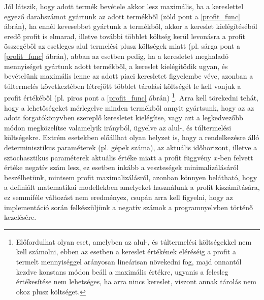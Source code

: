 Jól látszik, hogy adott termék bevétele akkor lesz maximális, ha a kereslettel egyező darabszámot gyártunk az adott termékből (zöld pont a \ref{profit_func} ábrán), ha ennél kevesebbet gyártunk a termékből, akkor a kereslet kielégítéséből eredő profit is elmarad, illetve további többlet költség kerül levonásra a profit összegéből az esetleges alul termelési plusz költségek miatt (pl. sárga pont a \ref{profit_func} ábrán), abban az esetben pedig, ha a keresletet meghaladó mennyiséget gyártunk adott termékből, a kereslet kielégítődik ugyan, és bevételünk maximális lenne az adott piaci keresletet figyelembe véve, azonban a túltermelés következtében létrejött többlet tárolási költségét le kell vonjuk a profit értékéből (pl. piros pont a \ref{profit_func} ábrán) \footnote{Előfordulhat olyan eset, amelyben az alul-, és túltermelési költségekkel nem kell számolni, ebben az esetben a kereslet értékének eléréséig a profit a termelt mennyiséggel arányosan lineárisan növekedni fog, majd onnantól kezdve konstans módon beáll a maximális értékre, ugyanis a felesleg értékesítése nem lehetséges, ha arra nincs kereslet, viszont annak tárolás nem okoz plusz költséget.}. Arra kell törekedni tehát, hogy a lehetőségeket mérlegelve minden termékből annyit gyártsunk, hogy az az adott forgatókönyvben szereplő keresletet kielégítse, vagy azt a legkedvezőbb módon megközelítse valamelyik irányból, ügyelve az alul-, és túltermelési költségekre. Extrém esetekben előállhat olyan helyzet is, hogy a rendelkezésre álló determinisztikus paraméterek (pl. gépek száma), az aktuális időhorizont, illetve a sztochasztikus paraméterek aktuális értéke miatt a profit függvény $x$-ben felvett értéke negatív szám lesz, ez esetben inkább a veszteségek minimalizálásáról beszélhetünk, mintsem profit maximalizálásról, azonban könnyen belátható, hogy a definiált matematikai modellekben amelyeket használunk a profit kiszámítására, ez semmiféle változást nem eredményez, csupán arra kell figyelni, hogy az implementáció során felkészüljünk a negatív számok a programnyelvben történő kezelésére.